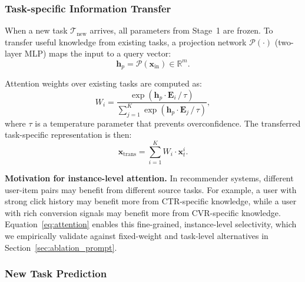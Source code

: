 \documentclass[review,anonymous]{acmart}
\begin{document}
\subsubsection{Task-specific Information Transfer}

When a new task $\mathcal{T}_{\text{new}}$ arrives, all parameters from Stage~1
are frozen. To transfer useful knowledge from existing tasks, a projection network
$\mathcal{P}(\cdot)$ (two-layer MLP) maps the input to a query vector:
\begin{equation}
  \mathbf{h}_p = \mathcal{P}(\mathbf{x}_{\text{in}}) \in \mathbb{R}^m.
  \label{eq:projection}
\end{equation}

Attention weights over existing tasks are computed as:
\begin{equation}
  W_i = \frac{\exp(\mathbf{h}_p \cdot \mathbf{E}_i \,/\, \tau)}{\sum_{j=1}^{K} \exp(\mathbf{h}_p \cdot \mathbf{E}_j \,/\, \tau)},
  \label{eq:attention}
\end{equation}
where $\tau$ is a temperature parameter that prevents overconfidence. The
transferred task-specific representation is then:
\begin{equation}
  \mathbf{x}_{\text{trans}} = \sum_{i=1}^{K} W_i \cdot \mathbf{x}_t^i.
  \label{eq:transferred}
\end{equation}

\textbf{Motivation for instance-level attention.} In recommender systems,
different user-item pairs may benefit from different source tasks. For example, a
user with strong click history may benefit more from CTR-specific knowledge, while
a user with rich conversion signals may benefit more from CVR-specific knowledge.
Equation~\eqref{eq:attention} enables this fine-grained, instance-level
selectivity, which we empirically validate against fixed-weight and task-level
alternatives in Section~\ref{sec:ablation_prompt}.

\subsubsection{New Task Prediction}
\end{document}
